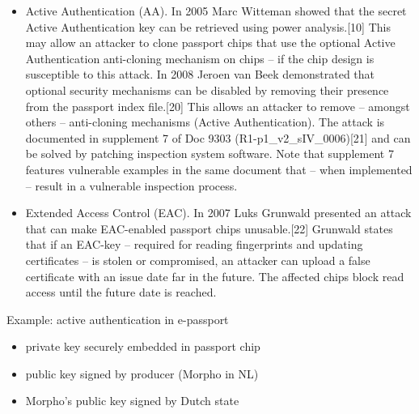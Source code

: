 \begin{itemize}
  \item Active Authentication (AA). In 2005 Marc Witteman showed that the secret Active Authentication key can be retrieved using power analysis.[10] This may allow an attacker to clone passport chips that use the optional Active Authentication anti-cloning mechanism on chips – if the chip design is susceptible to this attack. In 2008 Jeroen van Beek demonstrated that optional security mechanisms can be disabled by removing their presence from the passport index file.[20] This allows an attacker to remove – amongst others – anti-cloning mechanisms (Active Authentication). The attack is documented in supplement 7 of Doc 9303 (R1-p1\_v2\_sIV\_0006)[21] and can be solved by patching inspection system software. Note that supplement 7 features vulnerable examples in the same document that – when implemented – result in a vulnerable inspection process.
  \item Extended Access Control (EAC). In 2007 Luks Grunwald presented an attack that can make EAC-enabled passport chips unusable.[22] Grunwald states that if an EAC-key – required for reading fingerprints and updating certificates – is stolen or compromised, an attacker can upload a false certificate with an issue date far in the future. The affected chips block read access until the future date is reached.
\end{itemize}



Example: active authentication in e-passport
\begin{itemize}
	\item private key securely embedded in passport chip
  \item public key signed by producer (Morpho in NL)
  \item Morpho's public key signed by Dutch state
\end{itemize}
